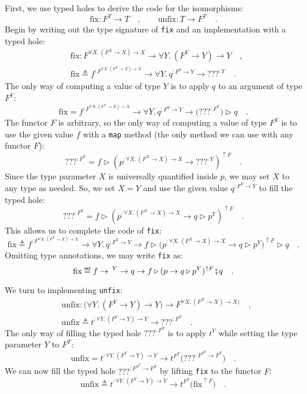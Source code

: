 First, we use typed holes to derive the code for the isomorphisms:
\[
\text{fix}:F^{T}\rightarrow T\quad,\quad\quad\text{unfix}:T\rightarrow F^{T}\quad.
\]
Begin by writing out the type signature of \lstinline!fix! and an
implementation with a typed hole:
\begin{align*}
 & \text{fix}:F^{\forall X.\,(F^{X}\rightarrow X)\rightarrow X}\rightarrow\forall Y.\,(F^{Y}\rightarrow Y)\rightarrow Y\quad,\\
 & \text{fix}\triangleq f^{:F^{\forall X.\,(F^{X}\rightarrow X)\rightarrow X}}\rightarrow\forall Y.\,q^{:F^{Y}\rightarrow Y}\rightarrow\text{???}^{:Y}\quad.
\end{align*}
The only way of computing a value of type $Y$ is to apply $q$ to
an argument of type $F^{Y}$:
\[
\text{fix}=f^{:F^{\forall X.\,(F^{X}\rightarrow X)\rightarrow X}}\rightarrow\forall Y.\,q^{:F^{Y}\rightarrow Y}\rightarrow\big(\text{???}^{:F^{Y}}\big)\triangleright q\quad.
\]
The functor $F$ is arbitrary, so the only way of computing a value
of type $F^{Y}$ is to use the given value $f$ with a \lstinline!map!
method (the only method we can use with any functor $F$):
\[
\text{???}^{:F^{Y}}=f\triangleright(p^{:\forall X.\,(F^{X}\rightarrow X)\rightarrow X}\rightarrow\text{???}^{:Y})^{\uparrow F}\quad.
\]
Since the type parameter $X$ is universally quantified inside $p$,
we may set $X$ to any type as needed. So, we set $X=Y$ and use the
given value $q^{:F^{Y}\rightarrow Y}$ to fill the typed hole:
\[
\text{???}^{:F^{Y}}=f\triangleright(p^{:\forall X.\,(F^{X}\rightarrow X)\rightarrow X}\rightarrow q\triangleright p^{Y})^{\uparrow F}\quad.
\]
This allows us to complete the code of \lstinline!fix!:
\[
\text{fix}\triangleq f^{:F^{\forall X.\,(F^{X}\rightarrow X)\rightarrow X}}\rightarrow\forall Y.\,q^{:F^{Y}\rightarrow Y}\rightarrow f\triangleright\big(p^{:\forall X.\,(F^{X}\rightarrow X)\rightarrow X}\rightarrow q\triangleright p^{Y}\big)^{\uparrow F}\triangleright q\quad.
\]
Omitting type annotations, we may write \lstinline!fix! as:
\[
\text{fix}\triangleq f\rightarrow\,^{Y}\rightarrow q\rightarrow f\triangleright(p\rightarrow q\triangleright p^{Y})^{\uparrow F}\bef q\quad.
\]

We turn to implementing \lstinline!unfix!:
\begin{align*}
 & \text{unfix}:\big(\forall Y.\,(F^{Y}\rightarrow Y)\rightarrow Y\big)\rightarrow F^{\forall X.\,(F^{X}\rightarrow X)\rightarrow X\big)}\quad,\\
 & \text{unfix}\triangleq t^{:\forall Y.\,(F^{Y}\rightarrow Y)\rightarrow Y}\rightarrow\text{???}^{:F^{T}}\quad.
\end{align*}
The only way of filling the typed hole $\text{???}^{:F^{T}}$ is to
apply $t^{Y}$ while setting the type parameter $Y$ to $F^{T}$:
\[
\text{unfix}=t^{:\forall Y.\,(F^{Y}\rightarrow Y)\rightarrow Y}\rightarrow t^{F^{T}}\big(\text{???}^{:F^{F^{T}}\rightarrow F^{T}}\big)\quad.
\]
We can now fill the typed hole $\text{???}^{:F^{F^{T}}\rightarrow F^{T}}$
by lifting \lstinline!fix! to the functor $F$:
\[
\text{unfix}\triangleq t^{:\forall Y.\,(F^{Y}\rightarrow Y)\rightarrow Y}\rightarrow t^{F^{T}}\big(\text{fix}^{\uparrow F}\big)\quad.
\]

